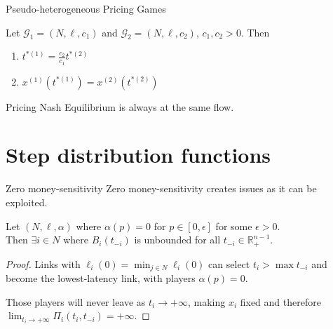 \documentclass{beamer}
\newcommand{\R}{\mathbb{R}}
\newcommand{\Gm}{\mathcal{G}}
\begin{document}
\begin{frame}{Pseudo-heterogeneous Pricing Games}
	\begin{lemma}
		Let $\Gm_1 = (N, \ell, c_1)$ and $\Gm_2 = (N, \ell, c_2)$, $c_1, c_2 > 0$.
		Then
		\begin{enumerate}[$(i)$]
			\item $t^{*(1)} = \frac{c_2}{c_1} t^{*(2)}$
			\item $x^{(1)}(t^{*(1)}) = x^{(2)}(t^{*(2)})$
		\end{enumerate}
	\end{lemma}
	Pricing Nash Equilibrium is always at the same flow.
\end{frame}

\section{Step distribution functions}

\begin{frame}{Zero money-sensitivity}
	Zero money-sensitivity creates issues as it can be exploited.
	\begin{lemma}
		Let $(N, \ell, \alpha)$ where $\alpha(p) = 0$ for $p \in [0, \epsilon]$ for some $\epsilon > 0$.\\
		Then $\exists i \in N$ where $B_i(t_{-i})$ is unbounded for all $t_{-i} \in \R_+^{n - 1}$.
	\end{lemma}\pause
	\begin{proof}
		Links with $\ell_i(0) = \min_{j \in N} \ell_i(0)$ can select $t_i > \max t_{-i}$ and become the lowest-latency link, with players $\alpha(p) = 0$.

		Those players will never leave as $t_i \rightarrow +\infty$, making $x_i$ fixed and therefore $\lim_{t_i \rightarrow +\infty} \Pi_i(t_i, t_{-i}) = +\infty$.
	\end{proof}
\end{frame}
\end{document}

